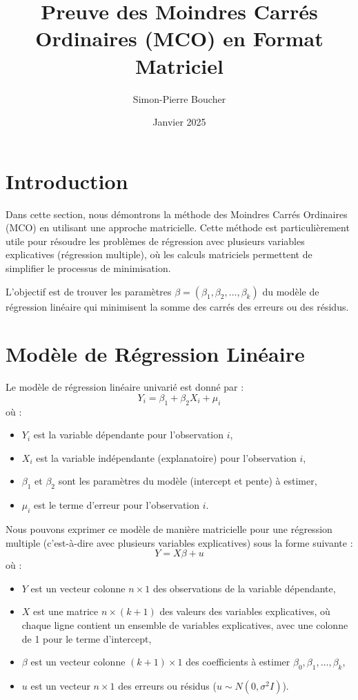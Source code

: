 \documentclass[14pt]{extarticle} %
\title{Preuve des Moindres Carrés Ordinaires (MCO) en Format Matriciel}
\author{Simon-Pierre Boucher}
\date{Janvier 2025}
\begin{document}
\maketitle
\tableofcontents
\newpage

\section{Introduction}
Dans cette section, nous démontrons la méthode des Moindres Carrés Ordinaires (MCO) en utilisant une approche matricielle. Cette méthode est particulièrement utile pour résoudre les problèmes de régression avec plusieurs variables explicatives (régression multiple), où les calculs matriciels permettent de simplifier le processus de minimisation.

L'objectif est de trouver les paramètres \(\beta = (\beta_1, \beta_2, \dots, \beta_k)\) du modèle de régression linéaire qui minimisent la somme des carrés des erreurs ou des résidus.

\section{Modèle de Régression Linéaire}
Le modèle de régression linéaire univarié est donné par :
\[
Y_i = \beta_1 + \beta_2 X_i + \mu_i
\]
où :
\begin{itemize}
    \item \(Y_i\) est la variable dépendante pour l'observation \(i\),
    \item \(X_i\) est la variable indépendante (explanatoire) pour l'observation \(i\),
    \item \(\beta_1\) et \(\beta_2\) sont les paramètres du modèle (intercept et pente) à estimer,
    \item \(\mu_i\) est le terme d'erreur pour l'observation \(i\).
\end{itemize}

Nous pouvons exprimer ce modèle de manière matricielle pour une régression multiple (c'est-à-dire avec plusieurs variables explicatives) sous la forme suivante :
\[
Y = X\beta + u
\]
où :
\begin{itemize}
    \item \(Y\) est un vecteur colonne \(n \times 1\) des observations de la variable dépendante,
    \item \(X\) est une matrice \(n \times (k+1)\) des valeurs des variables explicatives, où chaque ligne contient un ensemble de variables explicatives, avec une colonne de 1 pour le terme d'intercept,
    \item \(\beta\) est un vecteur colonne \( (k+1) \times 1 \) des coefficients à estimer \(\beta_0, \beta_1, \dots, \beta_k\),
    \item \(u\) est un vecteur \(n \times 1\) des erreurs ou résidus (\(u \sim N(0, \sigma^2I)\)).
\end{itemize}
\end{document}
